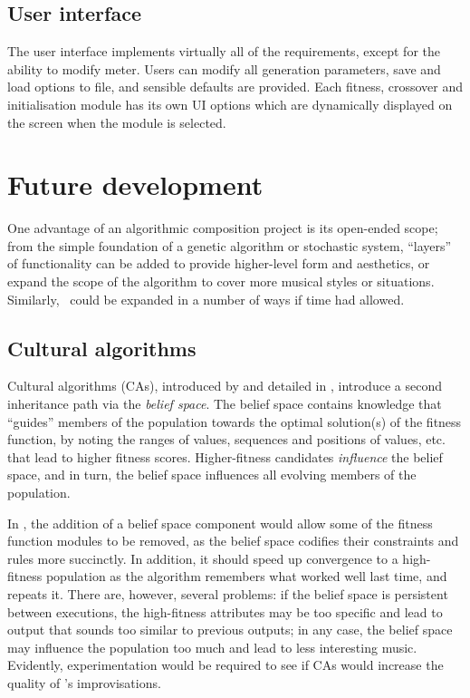 \subsection{User interface}

The user interface implements virtually all of the requirements, except for the ability to modify meter. Users can modify all generation parameters, save and load options to file, and sensible defaults are provided. Each fitness, crossover and initialisation module has its own UI options which are dynamically displayed on the screen when the module is selected.

\section{Future development}

One advantage of an algorithmic composition project is its open-ended scope; from the simple foundation of a genetic algorithm or stochastic system, ``layers'' of functionality can be added to provide higher-level form and aesthetics, or expand the scope of the algorithm to cover more musical styles or situations. Similarly, \jg\ could be expanded in a number of ways if time had allowed.

\subsection{Cultural algorithms}

Cultural algorithms (CAs), introduced by \cite{reynolds94} and detailed in \citep{reynolds94int}, introduce a second inheritance path via the \emph{belief space}. The belief space contains knowledge that ``guides'' members of the population towards the optimal solution(s) of the fitness function, by noting the ranges of values, sequences and positions of values, etc. that lead to higher fitness scores. Higher-fitness candidates \emph{influence} the belief space, and in turn, the belief space influences all evolving members of the population.

In \jg, the addition of a belief space component would allow some of the fitness function modules to be removed, as the belief space codifies their constraints and rules more succinctly. In addition, it should speed up convergence to a high-fitness population as the algorithm remembers what worked well last time, and repeats it. There are, however, several problems: if the belief space is persistent between executions, the high-fitness attributes may be too specific and lead to output that sounds too similar to previous outputs; in any case, the belief space may influence the population too much and lead to less interesting music. Evidently, experimentation would be required to see if CAs would increase the quality of \jg's improvisations.

